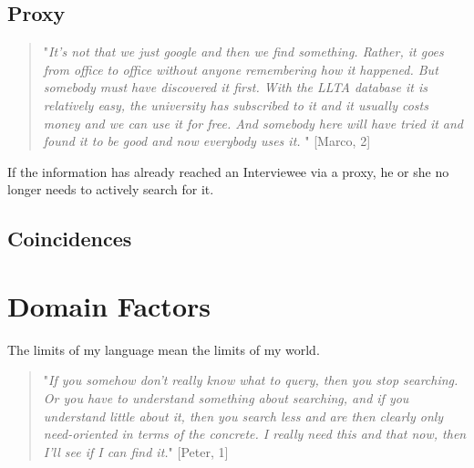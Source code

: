 \documentclass[12pt, a4paper, titlepage, oneside, abstract=true, toc=listof, toc=bibliography]{scrreprt}
\begin{document}
{%
\subsection{Proxy}
\label{sec:IP_Proxy}
%
\begin{quotation}
"\textit{It's not that we just google and then we find something. Rather, it goes from office to office without anyone remembering how it happened. But somebody must have discovered it first. With the LLTA database it is relatively easy, the university has subscribed to it and it usually costs money and we can use it for free. And somebody here will have tried it and found it to be good and now everybody uses it.} " [Marco, 2]
\end{quotation}


If the information has already reached an Interviewee via a proxy, he or she no longer needs to actively search for it.

\subsection{Coincidences}
\label{sec:IP_Coincidences}

\section{Domain Factors}
\label{sec:Domain_Factors}

The limits of my language mean the limits of my world. \citep{Wittgenstein1990}

\begin{quotation}
"\textit{If you somehow don't really know what to query, then you stop searching. Or you have to understand something about searching, and if you understand little about it, then you search less and are then clearly only need-oriented in terms of the concrete. I really need this and that now, then I'll see if I can find it.}" [Peter, 1]
\end{quotation}




}
\end{document}
